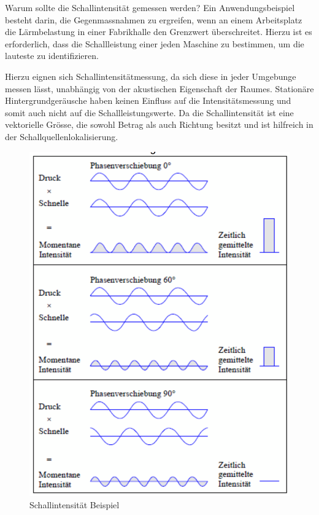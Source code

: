 Warum sollte die Schallintensität gemessen werden? Ein Anwendungsbeispiel besteht darin, die Gegenmassnahmen zu ergreifen, wenn an einem Arbeitsplatz die Lärmbelastung in einer Fabrikhalle den Grenzwert überschreitet. Hierzu ist es erforderlich, dass die Schallleistung einer jeden Maschine zu bestimmen, um die lauteste zu identifizieren.  \newline

Hierzu eignen sich Schallintensitätmessung, da sich diese in jeder Umgebunge messen lässt, unabhängig von der akustischen Eigenschaft der Raumes. Stationäre Hintergrundgeräusche haben keinen Einfluss auf die Intensitätsmessung und somit auch nicht auf die Schallleistungswerte. Da die Schallintensität ist eine vektorielle Grösse, die sowohl Betrag als auch Richtung besitzt und ist hilfreich in der Schallquellenlokalisierung.

\begin{figure}[h!]
	\centering
	\includegraphics[scale=0.5]{papers/helmholtz/images/Schallintensitaet.png}
	\caption{Schallintensität Beispiel}
	\label{fig:Schallintensitaet}
\end{figure}


